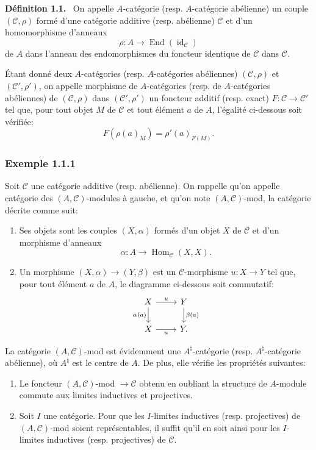 \documentclass[11pt]{article}
\newenvironment{statement}[1]{\par\medskip\noindent\textbf{#1.}\ }{\par\medskip}
\DeclareMathOperator{\Hom}{Hom}
\providecommand{\id}{\operatorname{id}}
\providecommand{\Hom}{\operatorname{Hom}}
\providecommand{\cC}{\mathcal C}
\providecommand{\End}{\operatorname{End}}
\providecommand{\id}{\operatorname{id}}
\providecommand{\id}{\operatorname{id}}
\providecommand{\End}{\operatorname{End}}
\providecommand{\id}{\operatorname{id}}
\providecommand{\id}{\operatorname{id}}
\providecommand{\cC}{\mathcal C}
\begin{document}
\begin{statement}{Définition 1.1}
On appelle $A$-catégorie (resp. $A$-catégorie abélienne) un couple $(\cC,\rho)$ formé d'une catégorie additive (resp. abélienne) $\cC$ et d'un homomorphisme d'anneaux
\[
\rho:A\longrightarrow \End(\id_{\cC})
\]
de $A$ dans l'anneau des endomorphismes du foncteur identique de $\cC$ dans $\cC$.
\end{statement}

Étant donné deux $A$-catégories (resp. $A$-catégories abéliennes) $(\cC,\rho)$ et $(\cC',\rho')$, on appelle morphisme de $A$-catégories (resp. de $A$-catégories abéliennes) de $(\cC,\rho)$ dans $(\cC',\rho')$ un foncteur additif (resp. exact) $F:\cC\to\cC'$ tel que, pour tout objet $M$ de $\cC$ et tout élément $a$ de $A$, l'égalité ci-dessous soit vérifiée:
\[
F(\rho(a)_M)=\rho'(a)_{F(M)}.
\]

\subsubsection*{Exemple 1.1.1}
Soit $\cC$ une catégorie additive (resp. abélienne). On rappelle qu'on appelle catégorie des $(A,\cC)$-modules à gauche, et qu'on note $(A,\cC)$-mod, la catégorie décrite comme suit:
\begin{enumerate}[label=(\roman*)]
\item Ses objets sont les couples $(X,\alpha)$ formés d'un objet $X$ de $\cC$ et d'un morphisme d'anneaux
\[
\alpha:A\longrightarrow \Hom_{\cC}(X,X).
\]
\item Un morphisme $(X,\alpha)\to(Y,\beta)$ est un $\cC$-morphisme $u:X\to Y$ tel que, pour tout élément $a$ de $A$, le diagramme ci-dessous soit commutatif:
\[
\begin{tikzcd}
X \arrow[r,"u"] \arrow[d,"\alpha(a)"'] & Y \arrow[d,"\beta(a)"]\\
X \arrow[r,"u"'] & Y .
\end{tikzcd}
\]
\end{enumerate}
La catégorie $(A,\cC)$-mod est évidemment une $A^{\natural}$-catégorie (resp. $A^{\natural}$-catégorie abélienne), où $A^{\natural}$ est le centre de $A$. De plus, elle vérifie les propriétés suivantes:
\begin{enumerate}[label=(\alph*)]
\item Le foncteur $(A,\cC)$-mod $\to\cC$ obtenu en oubliant la structure de $A$-module commute aux limites inductives et projectives.
\item Soit $I$ une catégorie. Pour que les $I$-limites inductives (resp. projectives) de $(A,\cC)$-mod soient représentables, il suffit qu'il en soit ainsi pour les $I$-limites inductives (resp. projectives) de $\cC$.
\end{enumerate}
\end{document}

